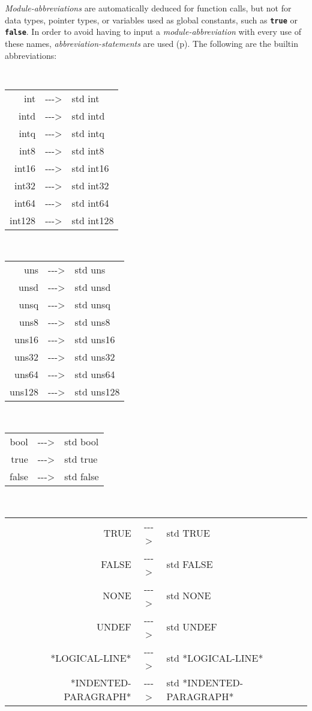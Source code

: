 \documentclass[12pt]{article}
\newcommand{\TT}[1]{{\tt \bfseries #1}}
\newcommand{\ABV}{-{}-{}->}
\newcommand{\pagref}[1]{p\pageref{#1}}
\begin{document}
{\em Module-abbreviations} are automatically deduced for function
calls, but not for data types, pointer types, or variables used
as global constants, such as \TT{true} or \TT{false}.
In order to avoid having to
input a {\em module-abbreviation} with every use of these names,
{\em abbreviation-statements} are used (\pagref{ABBREVIATION-STATEMENT}).
The following are the builtin abbreviations:
\begin{center}
\tt
\begin{tabular}{rcl}
int		& \ABV & std int \\
intd		& \ABV & std intd \\
intq		& \ABV & std intq \\
int8		& \ABV & std int8 \\
int16		& \ABV & std int16 \\
int32		& \ABV & std int32 \\
int64		& \ABV & std int64 \\
int128		& \ABV & std int128
\end{tabular}
\\[1ex]
\begin{tabular}{rcl}
uns		& \ABV & std uns \\
unsd		& \ABV & std unsd \\
unsq		& \ABV & std unsq \\
uns8		& \ABV & std uns8 \\
uns16		& \ABV & std uns16 \\
uns32		& \ABV & std uns32 \\
uns64		& \ABV & std uns64 \\
uns128		& \ABV & std uns128
\end{tabular}
\\[1ex]
\begin{tabular}{rcl}
bool		& \ABV & std bool \\
true		& \ABV & std true \\
false		& \ABV & std false
\end{tabular}
\\[1ex]
\begin{tabular}{rcl}
TRUE		& \ABV & std TRUE \\
FALSE		& \ABV & std FALSE \\
NONE		& \ABV & std NONE \\
UNDEF		& \ABV & std UNDEF \\
*LOGICAL-LINE*		& \ABV & std *LOGICAL-LINE* \\
*INDENTED-PARAGRAPH*	& \ABV & std *INDENTED-PARAGRAPH* \\

\end{tabular}
\end{center}
\end{document}
